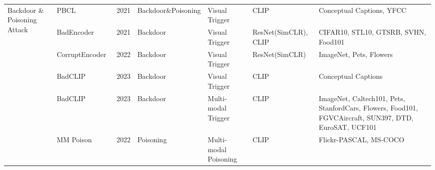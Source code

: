 \begin{table*}[htp]
{\begin{tabular}{llllllp{10cm}}
\multirow{6}{0.1\textwidth}{Backdoor \& Poisoning Attack}
& PBCL~\cite{carlini2022poisoning}
  & 2021 & Backdoor\&Poisoning
  & Visual Trigger
  & CLIP
  & Conceptual Captions, YFCC \\
& \cellcolor{gray!15}BadEncoder~\cite{jia2022badencoder}
  & \cellcolor{gray!15}2021
  & \cellcolor{gray!15}Backdoor
  & \cellcolor{gray!15}Visual Trigger
  & \cellcolor{gray!15}ResNet(SimCLR), CLIP
  & \cellcolor{gray!15}CIFAR10, STL10, GTSRB, SVHN, Food101 \\
& CorruptEncoder~\cite{zhang2024data}
  & 2022 & Backdoor
  & Visual Trigger
  & ResNet(SimCLR)
  & ImageNet, Pets, Flowers \\
& \cellcolor{gray!15}BadCLIP~\cite{liang2024badclip}
  & \cellcolor{gray!15}2023
  & \cellcolor{gray!15}Backdoor
  & \cellcolor{gray!15}Visual Trigger
  & \cellcolor{gray!15}CLIP
  & \cellcolor{gray!15}Conceptual Captions \\
& BadCLIP~\cite{bai2024badclip}
  & 2023 & Backdoor
  & Multi-modal Trigger
  & CLIP
  & ImageNet, Caltech101, Pets, StanfordCars, Flowers, Food101, FGVCAircraft, SUN397, DTD, EuroSAT, UCF101 \\
& \cellcolor{gray!15}MM Poison~\cite{yang2023data}
  & \cellcolor{gray!15}2022
  & \cellcolor{gray!15}Poisoning
  & \cellcolor{gray!15}Multi-modal Poisoning
  & \cellcolor{gray!15}CLIP
  & \cellcolor{gray!15}Flickr-PASCAL, MS-COCO \\
\hline


\end{tabular}}
\end{table*}
